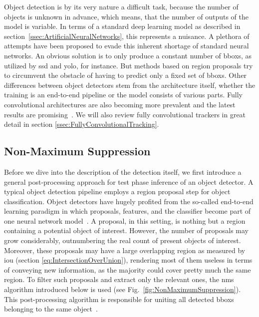 Object detection is by its very nature a difficult task, because the number of objects is unknown in advance, which means, that the number of outputs of the model is variable. In terms of a standard deep learning model as described in section~\ref{ssec:ArtificialNeuralNetworks}, this represents a nuisance. A plethora of attempts have been proposed to evade this inherent shortage of standard neural networks. An obvious solution is to only produce a constant number of \glspl{bbox}, as utilized by \gls{ssd} and \gls{yolo}, for instance. But methods based on region proposals try to circumvent the obstacle of having to predict only a fixed set of \glspl{bbox}. Other differences between object detectors stem from the architecture itself, whether the training is an end-to-end pipeline or the model consists of various parts. Fully convolutional architectures are also becoming more prevalent and the latest results are promising~\cite{tian2019fcos}. We will also review fully convolutional trackers in great detail in section \ref{ssec:FullyConvolutionalTracking}.

\subsection{Non-Maximum Suppression}
\label{ssec:NonMaximumSuppression}

Before we dive into the description of the detection itself, we first introduce a general post-processing approach for test phase inference of an object detector. A typical object detection pipeline employs a region proposal step for object classification. Object detectors have hugely profited from the so-called end-to-end learning paradigm in which proposals, features, and the classifier become part of one neural network model~\cite{hosang2017learningnms}. A proposal, in this setting, is nothing but a region containing a potential object of interest. However, the number of proposals may grow considerably, outnumbering the real count of present objects of interest. Moreover, these proposals may have a large overlapping region as measured by \gls{iou} (section \ref{eq:IntersectionOverUnion}), rendering most of them useless in terms of conveying new information, as the majority could cover pretty much the same region. To filter such proposals and extract only the relevant ones, the \gls{nms} algorithm introduced below is used (see Fig.~\ref{fig:NonMaximumSuppression}). This post-processing algorithm is responsible for uniting all detected \glspl{bbox} belonging to the same object~\cite{hosang2017learningnms}.

